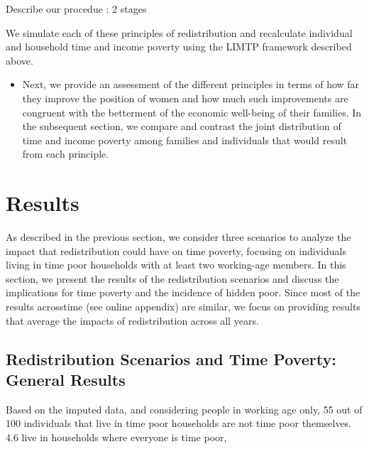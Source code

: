 \documentclass[
  11pt,
]{article}
\providecommand{\tightlist}{%
  \setlength{\itemsep}{0pt}\setlength{\parskip}{0pt}}\usepackage{longtable,booktabs,array}
\begin{document}
Describe our procedue : 2 stages

We simulate each of these principles of redistribution and recalculate
individual and household time and income poverty using the LIMTP
framework described above.

\begin{itemize}
\tightlist
\item
  Next, we provide an assessment of the different principles in terms of
  how far they improve the position of women and how much such
  improvements are congruent with the betterment of the economic
  well-being of their families. In the subsequent section, we compare
  and contrast the joint distribution of time and income poverty among
  families and individuals that would result from each principle.
\end{itemize}

\section{Results}\label{results}

As described in the previous section, we consider three scenarios to
analyze the impact that redistribution could have on time poverty,
focusing on individuals living in time poor households with at least two
working-age members. In this section, we present the results of the
redistribution scenarios and discuss the implications for time poverty
and the incidence of hidden poor. Since most of the results acrosstime
(see online appendix) are similar, we focus on providing results that
average the impacts of redistribution across all years.

\subsection{Redistribution Scenarios and Time Poverty: General
Results}\label{redistribution-scenarios-and-time-poverty-general-results}

Based on the imputed data, and considering people in working age only,
55 out of 100 individuals that live in time poor households are not time
poor themselves. 4.6 live in households where everyone is time poor,
\end{document}
